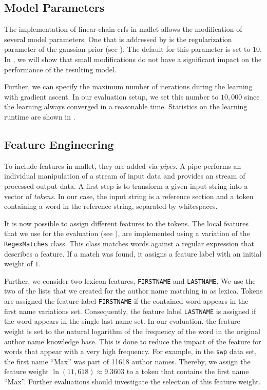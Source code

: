 \subsection{Model Parameters}\label{subsec:i-model-parameters}

The implementation of \glspl{linear-chain crf} in \gls{mallet} allows the modification of several model parameters.
One that is addressed by  is the regularization parameter of the \gls{gaussian prior} (see ).
The default for this parameter is set to $10$.
In , we will show that small modifications do not have a significant impact on the performance of the resulting model.

Further, we can specify the maximum number of iterations during the learning with gradient ascent.
In our evaluation setup, we set this number to $10,000$ since the learning always converged in a reasonable time.
Statistics on the learning runtime are shown in .

\subsection{Feature Engineering}\label{subsec:i-feature-engineering}

To include features in \gls{mallet}, they are added via \textit{pipes}.
A pipe performs an individual manipulation of a stream of input data and provides an stream of processed output data.
A first step is to transform a given input string into a vector of \textit{tokens}.
In our case, the input string is a reference section and a token containing a word in the reference string, separated by whitespaces.

It is now possible to assign different features to the tokens.
The local features that we use for the evaluation (see ), are implemented using a variation of the \texttt{RegexMatches} class.
This class matches words against a regular expression that describes a feature.
If a match was found, it assigns a feature label with an initial weight of $1$.

Further, we consider two lexicon features, \texttt{FIRSTNAME} and \texttt{LASTNAME}.
We use the two of the lists that we created for the author name matching in  as lexica.
Tokens are assigned the feature label \texttt{FIRSTNAME} if the contained word appears in the first name variations set.
  Consequently, the feature label \texttt{LASTNAME} is assigned if the word appears in the single last name set.
In our evaluation, the feature weight is set to the natural logarithm of the frequency of the word in the original author name knowledge base.
This is done to reduce the impact of the feature for words that appear with a very high frequency.
For example, in the \texttt{swp} data set, the first name ``Max'' was part of \num{11618} author names.
Thereby, we assign the feature weight $\ln(11,618)\approx9.3603$ to a token that contains the first name ``Max''.
Further evaluations should investigate the selection of this feature weight.

